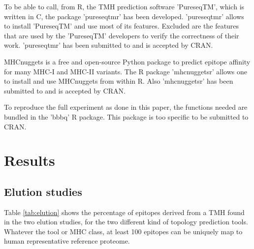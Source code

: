 
To be able to call, from R, the TMH prediction software 'PureseqTM',
which is written in C, the package 'pureseqtmr' has been developed. 
'pureseqtmr' allows to install 'PureseqTM' and use most of its features.
Excluded are the features that are used by the 'PureseqTM' 
developers to verify the correctness of their work.
'pureseqtmr' has been submitted to and is accepted by CRAN.


MHCnuggets is a free and open-source Python package to predict 
epitope affinity for many MHC-I and MHC-II variants.
The R package 'mhcnuggetsr' allows one to install and use MHCnuggets
from within R.
Also 'mhcnuggetsr' has been submitted to and is accepted by CRAN.


To reproduce the full experiment as done in this paper,
the functions needed are bundled in the 'bbbq' R package.
This package is too specific to be submitted to CRAN.

\section{Results}

\subsection{Elution studies}



Table \ref{tab:elution} shows the percentage of epitopes derived from a TMH
found in the two elution studies, for the two different kind of topology
prediction tools. Whatever the tool or MHC class, at least 100 epitopes
can be uniquely map to human representative reference proteome.

